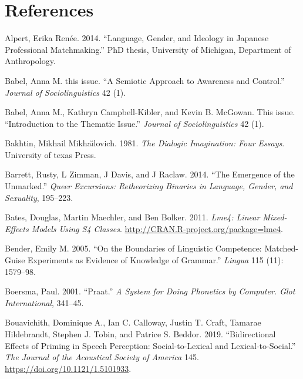 \documentclass[
  letterpaper,
  DIV=11,
  numbers=noendperiod]{scrartcl}
\newlength{\cslhangindent}
\newenvironment{CSLReferences}[2] %
 {\begin{list}{}{%
  \setlength{\itemindent}{0pt}
  \setlength{\leftmargin}{0pt}
  \setlength{\parsep}{0pt}
  \ifodd #1
   \setlength{\leftmargin}{\cslhangindent}
   \setlength{\itemindent}{-1\cslhangindent}
  \fi
  \setlength{\itemsep}{#2\baselineskip}}}
 {\end{list}}
\begin{document}
\section*{References}\label{sec-references}

\label{refs}
\begin{CSLReferences}{1}{0}
Alpert, Erika Renée. 2014. {``Language, Gender, and Ideology in Japanese
Professional Matchmaking.''} PhD thesis, University of Michigan,
Department of Anthropology.

Babel, Anna M. this issue. {``A Semiotic Approach to Awareness and
Control.''} \emph{Journal of Sociolinguistics} 42 (1).

Babel, Anna M., Kathryn Campbell-Kibler, and Kevin B. McGowan. This
issue. {``Introduction to the Thematic Issue.''} \emph{Journal of
Sociolinguistics} 42 (1).

Bakhtin, Mikhail Mikhaı̆lovich. 1981. \emph{The Dialogic Imagination:
Four Essays}. University of texas Press.

Barrett, Rusty, L Zimman, J Davis, and J Raclaw. 2014. {``The Emergence
of the Unmarked.''} \emph{Queer Excursions: Retheorizing Binaries in
Language, Gender, and Sexuality}, 195--223.

Bates, Douglas, Martin Maechler, and Ben Bolker. 2011. \emph{Lme4:
Linear Mixed-Effects Models Using S4 Classes}.
\url{http://CRAN.R-project.org/package=lme4}.

Bender, Emily M. 2005. {``On the Boundaries of Linguistic Competence:
Matched-Guise Experiments as Evidence of Knowledge of Grammar.''}
\emph{Lingua} 115 (11): 1579--98.

Boersma, Paul. 2001. {``Praat.''} \emph{A System for Doing Phonetics by
Computer. {Glot} {International}}, 341--45.

Bouavichith, Dominique A., Ian C. Calloway, Justin T. Craft, Tamarae
Hildebrandt, Stephen J. Tobin, and Patrice S. Beddor. 2019.
{``Bidirectional Effects of Priming in Speech Perception:
Social-to-Lexical and Lexical-to-Social.''} \emph{The Journal of the
Acoustical Society of America} 145.
\url{https://doi.org/10.1121/1.5101933}.


\end{CSLReferences}
\end{document}
